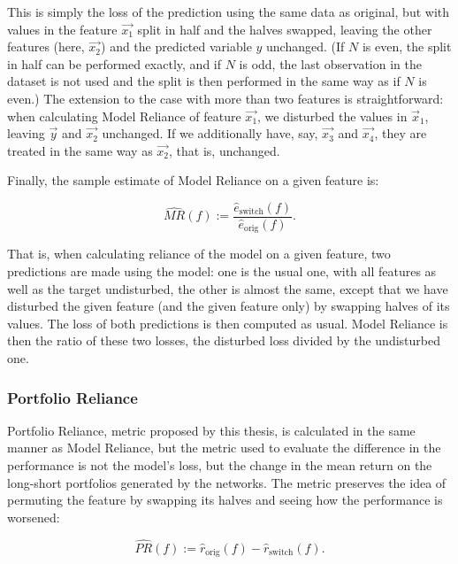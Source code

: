 			This is simply the loss of the prediction using the same data as original, but with values in the feature $\vec{x_1}$ split in half and the halves swapped, leaving the other features (here, $\vec{x_2}$) and the predicted variable $y$ unchanged. (If $N$ is even, the split in half can be performed exactly, and if $N$ is odd, the last observation in the dataset is not used and the split is then performed in the same way as if $N$ is even.) The extension to the case with more than two features is straightforward: when calculating Model Reliance of feature $\vec{x_1}$, we disturbed the values in $\vec{x}_1$, leaving $\vec{y}$ and $\vec{x_2}$ unchanged. If we additionally have, say, $\vec{x_3}$ and $\vec{x_4}$, they are treated in the same way as $\vec{x_2}$, that is, unchanged. 
			
			Finally, the sample estimate of Model Reliance on a given feature is: 
			
			\begin{equation*}
				\widehat{MR}(f):=\frac{\hat{e}_{\text{switch}}(f)}{\hat{e}_{\text{orig}}(f)}.
			\end{equation*}
				
			That is, when calculating reliance of the model on a given feature, two predictions are made using the model: one is the usual one, with all features as well as the target undisturbed, the other is almost the same, except that we have disturbed the given feature (and the given feature only) by swapping halves of its values. The loss of both predictions is then computed as usual. Model Reliance is then the ratio of these two losses, the disturbed loss divided by the undisturbed one.   
			
		\subsubsection{Portfolio Reliance}
			\label{chap:portfolio_reliance}
			
			Portfolio Reliance, metric proposed by this thesis, is calculated in the same manner as Model Reliance, but the metric used to evaluate the difference in the performance is not the model's loss, but the change in the mean return on the long-short portfolios generated by the networks. The metric preserves the idea of permuting the feature by swapping its halves and seeing how the performance is worsened: 

			\begin{equation*}
				\widehat{PR}(f):=\hat{r}_{\text{orig}}(f) - \hat{r}_{\text{switch}}(f).
			\end{equation*}
		

